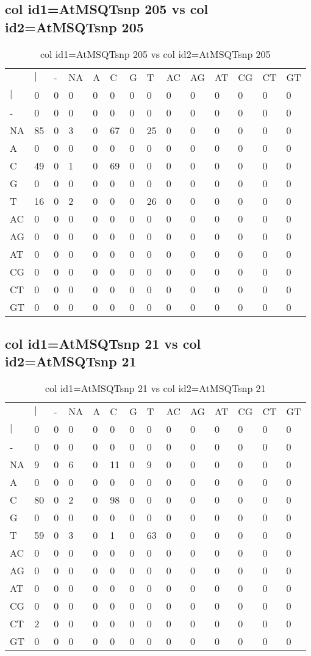 \subsection{col id1=AtMSQTsnp 205 vs col id2=AtMSQTsnp 205}
\begin{center}
\begin{longtable}{|l|l|l|l|l|l|l|l|l|l|l|l|l|l|}
\caption{col id1=AtMSQTsnp 205 vs col id2=AtMSQTsnp 205} \label{table_dm776}\\
\hline
\\
\hline
&$|$&-&NA&A&C&G&T&AC&AG&AT&CG&CT&GT\\
$|$&0&0&0&0&0&0&0&0&0&0&0&0&0\\
-&0&0&0&0&0&0&0&0&0&0&0&0&0\\
NA&85&0&3&0&67&0&25&0&0&0&0&0&0\\
A&0&0&0&0&0&0&0&0&0&0&0&0&0\\
C&49&0&1&0&69&0&0&0&0&0&0&0&0\\
G&0&0&0&0&0&0&0&0&0&0&0&0&0\\
T&16&0&2&0&0&0&26&0&0&0&0&0&0\\
AC&0&0&0&0&0&0&0&0&0&0&0&0&0\\
AG&0&0&0&0&0&0&0&0&0&0&0&0&0\\
AT&0&0&0&0&0&0&0&0&0&0&0&0&0\\
CG&0&0&0&0&0&0&0&0&0&0&0&0&0\\
CT&0&0&0&0&0&0&0&0&0&0&0&0&0\\
GT&0&0&0&0&0&0&0&0&0&0&0&0&0\\
\hline
\end{longtable}
\end{center}

\subsection{col id1=AtMSQTsnp 21 vs col id2=AtMSQTsnp 21}
\begin{center}
\begin{longtable}{|l|l|l|l|l|l|l|l|l|l|l|l|l|l|}
\caption{col id1=AtMSQTsnp 21 vs col id2=AtMSQTsnp 21} \label{table_dm778}\\
\hline
\\
\hline
&$|$&-&NA&A&C&G&T&AC&AG&AT&CG&CT&GT\\
$|$&0&0&0&0&0&0&0&0&0&0&0&0&0\\
-&0&0&0&0&0&0&0&0&0&0&0&0&0\\
NA&9&0&6&0&11&0&9&0&0&0&0&0&0\\
A&0&0&0&0&0&0&0&0&0&0&0&0&0\\
C&80&0&2&0&98&0&0&0&0&0&0&0&0\\
G&0&0&0&0&0&0&0&0&0&0&0&0&0\\
T&59&0&3&0&1&0&63&0&0&0&0&0&0\\
AC&0&0&0&0&0&0&0&0&0&0&0&0&0\\
AG&0&0&0&0&0&0&0&0&0&0&0&0&0\\
AT&0&0&0&0&0&0&0&0&0&0&0&0&0\\
CG&0&0&0&0&0&0&0&0&0&0&0&0&0\\
CT&2&0&0&0&0&0&0&0&0&0&0&0&0\\
GT&0&0&0&0&0&0&0&0&0&0&0&0&0\\
\hline
\end{longtable}
\end{center}

